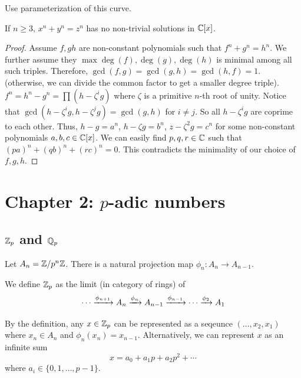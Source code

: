 \documentclass[15pt]{scrartcl}
\begin{document}
Use parameterization of this curve. 
\\

\begin{theorem}
    If $n\geq 3$, $x^n+y^n=z^n$ has no non-trivial solutions in $\mathbb C[x]$. 
\end{theorem}
\begin{proof}
    Assume $f,g h$ are non-constant polynomials such that $f^n+g^n=h^n$. We further assume they $\max{\deg(f), \deg(g), \deg(h)}$ is minimal among all such triples. Therefore, $\gcd(f,g)=\gcd(g,h)=\gcd(h,f)=1$. (otherwise, we can divide the common factor to get a smaller degree triple).
    \\

    $f^n=h^n-g^n=\prod (h-\zeta^i g)$ where $\zeta$ is a primitive $n$-th root of unity. Notice that $\gcd(h-\zeta^i g,h-\zeta^j g)=\gcd(g,h)$ for $i\neq j$. So all $h-\zeta^i g$ are coprime to each other. Thus, $h-g=a^n$, $h-\zeta g=b^n$, $z-\zeta^2 g=c^n$ for some non-constant polynomials $a,b,c\in \mathbb C[x]$. We can easily find $p, q,r \in \mathbb C$ such that $(pa)^n+(qb)^n+(rc)^n=0$. This contradicts the minimality of our choice of $f,g,h$.
\end{proof}
\newpage
\section{Chapter 2: $p$-adic numbers}
\subsection{$\mathbb Z_p$ and $\mathbb Q_p$}
Let $A_n=\mathbb Z/p^n\mathbb Z$. There is a natural projection map $\phi_n: A_{n}\to A_{n-1}$.
\begin{definition}
    We define $\mathbb Z_p$ as the limit (in category of rings) of 
    \[\cdots \xrightarrow{\phi_{n+1}} A_n \xrightarrow{\phi_{n}} A_{n-1} \xrightarrow{\phi_{n-1}} \cdots \xrightarrow{\phi_{2}} A_1\]
\end{definition}
By the definition, any $x\in \mathbb Z_p$ can be represented as a seqeunce $(\ldots,x_2,x_1)$ where $x_n\in A_n$ and $\phi_n(x_n)=x_{n-1}$. Alternatively, we can represent $x$ as an infinite sum
\[x=a_0+a_1 p + a_2 p^2 + \cdots\]
where $a_i\in \{0,1,\ldots,p-1\}$. 
\end{document}
